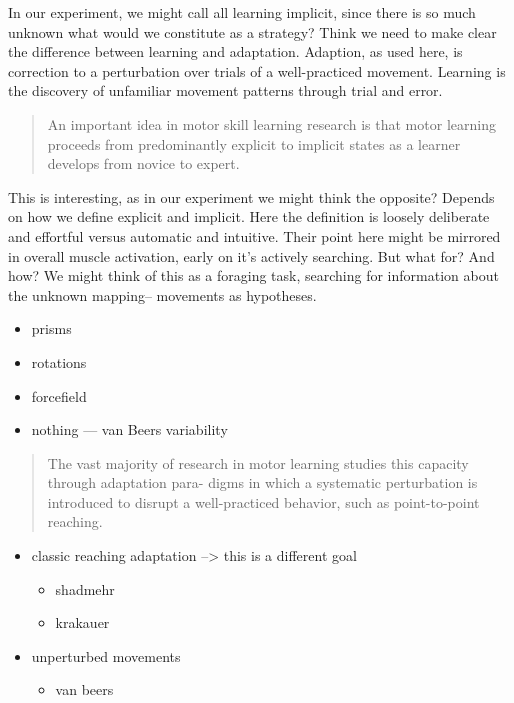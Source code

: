 \documentclass[../main.tex]{subfiles}
\begin{document}
In our experiment, we might call all learning implicit, since there is so much unknown what would we constitute as a strategy? Think we need to make clear the difference between learning and adaptation. Adaption, as used here, is correction to a perturbation over trials of a well-practiced movement. Learning is the discovery of unfamiliar movement patterns through trial and error.

\begin{quote}
An important idea in motor skill learning research is that motor learning proceeds from predominantly explicit to implicit states as a learner develops from novice to expert.
\end{quote}

This is interesting, as in our experiment we might think the opposite? Depends on how we define explicit and implicit. Here the definition is loosely deliberate and effortful versus automatic and intuitive. Their point here might be mirrored in overall muscle activation, early on it's actively searching. But what for? And how? We might think of this as a foraging task, searching for information about the unknown mapping-- movements as hypotheses.

\begin{itemize}
\item
  prisms
\item
  rotations
\item
  forcefield
\item
  nothing --- van Beers variability
\end{itemize}

\begin{quote}
The vast majority of research in motor learning studies this capacity through adaptation para- digms in which a systematic perturbation is introduced to disrupt a well-practiced behavior, such as point-to-point reaching. \cite{@adrianTheoreticalModelsMotor2012}
\end{quote}

\begin{itemize}
\item
  classic reaching adaptation --\textgreater{} this is a different goal

  \begin{itemize}  
  \item
    shadmehr
  \item
    krakauer
  \end{itemize}
\item
  unperturbed movements

  \begin{itemize}  
  \item
    van beers
  \end{itemize}
\end{itemize}
\end{document}

